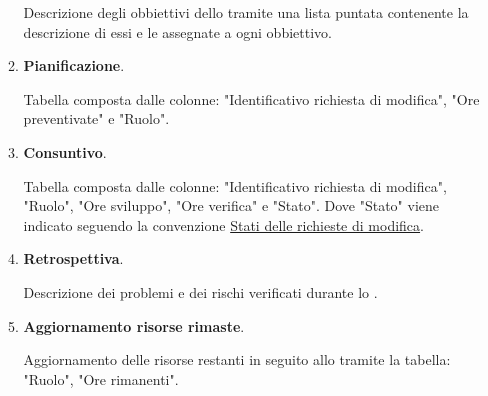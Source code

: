 \begin{enumerate}
\begin{enumerate}
        Descrizione degli obbiettivi dello  tramite una lista puntata contenente la descrizione di essi e le  assegnate a ogni obbiettivo.
        \item \textbf{Pianificazione}.
        
        Tabella composta dalle colonne: "Identificativo richiesta di modifica", "Ore preventivate" e "Ruolo".

        \item \textbf{Consuntivo}.
        
        Tabella composta dalle colonne: "Identificativo richiesta di modifica", "Ruolo", "Ore sviluppo", "Ore verifica" e "Stato".
        Dove "Stato" viene indicato seguendo la convenzione \hyperref[par:stati]{Stati delle richieste di modifica}.
        
        \item \textbf{Retrospettiva}.
        
        Descrizione dei problemi e dei rischi verificati durante lo .

        \item \textbf{Aggiornamento risorse rimaste}.
        
        Aggiornamento delle risorse restanti in seguito allo  tramite la tabella:
        "Ruolo", "Ore rimanenti".
        
    \end{enumerate}

\end{enumerate}